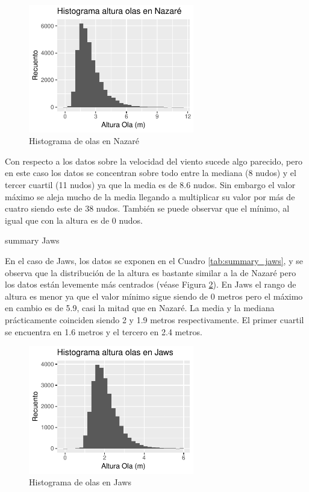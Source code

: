 \begin{figure}[H]
\centering
\includegraphics[height=5.6cm]{./figures/nazare_hist_wave.pdf}
  \caption{Histograma de olas en Nazaré}
  \label{fig:hist_waves_nazare}
\end{figure}
Con respecto a los datos sobre la velocidad del viento sucede algo parecido, pero en este caso los datos se concentran sobre todo entre la mediana (8 nudos) y el tercer cuartil (11 nudos) ya que la media es de 8.6 nudos. Sin embargo el valor máximo se aleja mucho de la media llegando a multiplicar su valor por más de cuatro siendo este de 38 nudos. También se puede observar que el mínimo, al igual que con la altura es de 0 nudos.


\begin{table}[htbp]
\centering

\caption{summary Jaws}
\label{tab:summary_jaws}
\end{table}


En el caso de Jaws, los datos se exponen en el Cuadro \ref{tab:summary_jaws}, y se observa que la distribución de la altura es bastante similar a la de Nazaré pero los datos están levemente más centrados (véase Figura \ref{fig:hist_waves_jaws}). En Jaws el rango de altura es menor ya que el valor mínimo sigue siendo de 0 metros pero el máximo en cambio es de 5.9, casi la mitad que en Nazaré. La media y la mediana prácticamente coinciden siendo 2 y 1.9 metros respectivamente. El primer cuartil se encuentra en 1.6 metros y el tercero en 2.4 metros.

\begin{figure}[H]
\centering
\includegraphics[height=5.6cm]{./figures/jaws_hist_wave.pdf}
  \caption{Histograma de olas en Jaws}
  \label{fig:hist_waves_jaws}
\end{figure}

